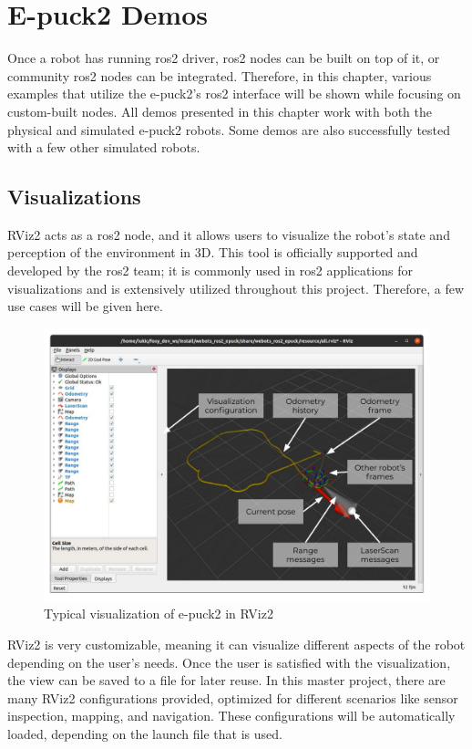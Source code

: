 \chapter{E-puck2 Demos}
\label{chap:demos}

Once a robot has running \ac{ros2} driver, \ac{ros2} nodes can be built on top of it, or community \ac{ros2} nodes can be integrated.
Therefore, in this chapter, various examples that utilize the e-puck2's \ac{ros2} interface will be shown while focusing on custom-built nodes.
All demos presented in this chapter work with both the physical and simulated e-puck2 robots.
Some demos are also successfully tested with a few other simulated robots.

\section{Visualizations}
RViz2 acts as a \ac{ros2} node, and it allows users to visualize the robot's state and perception of the environment in 3D.
This tool is officially supported and developed by the \ac{ros2} team; it is commonly used in \ac{ros2} applications for visualizations and is extensively utilized throughout this project. 
Therefore, a few use cases will be given here.

\begin{figure}[H]
    \centering
    \includegraphics[width=\textwidth]{demos/figures/rviz.pdf}
    \caption{Typical visualization of e-puck2 in RViz2}
    \label{fig:demos:rviz}
\end{figure}

RViz2 is very customizable, meaning it can visualize different aspects of the robot depending on the user's needs.
Once the user is satisfied with the visualization, the view can be saved to a file for later reuse.
In this master project, there are many RViz2 configurations provided, optimized for different scenarios like sensor inspection, mapping, and navigation.
These configurations will be automatically loaded, depending on the launch file that is used.

